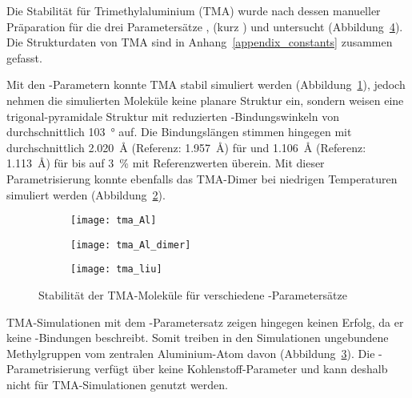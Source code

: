 Die Stabilität für Trimethylaluminium (TMA) wurde nach dessen manueller Präparation für die drei Parametersätze ,  (kurz ) und  untersucht (Abbildung~\ref{fig:tmastability}).
Die Strukturdaten von TMA\cite{haynes_crc_2011} sind in Anhang~\ref{appendix_constants} zusammen gefasst.

Mit den -Parametern konnte TMA stabil simuliert werden (Abbildung~\ref{fig:tmamonomer}), jedoch nehmen die simulierten Moleküle keine planare Struktur ein, sondern weisen eine trigonal-pyramidale Struktur mit reduzierten -Bindungs\-winkeln von durchschnittlich \SI{103}{\degree} auf.
Die Bindungslängen stimmen hingegen mit durchschnittlich \SI{2.020}{\angstrom} (Referenz: \SI{1.957}{\angstrom}\cite{haynes_crc_2011}) für  und \SI{1.106}{\angstrom} (Referenz: \SI{1.113}{\angstrom}\cite{haynes_crc_2011}) für  bis auf \SI{3}{\percent} mit Referenzwerten überein.
Mit dieser Parametrisierung konnte ebenfalls das TMA-Dimer bei niedrigen Temperaturen simuliert werden (Abbildung~\ref{fig:tmadimer}).

\begin{figure}[b!]
  \captionsetup[subfigure]{singlelinecheck=false}
  \begin{subfigure}[t]{4cm}
    \texttt{[image: tma\_Al]}
    \label{fig:tmamonomer}
  \end{subfigure}
  \hfill
  \begin{subfigure}[t]{5.5cm}
    \texttt{[image: tma\_Al\_dimer]}
    \label{fig:tmadimer}
  \end{subfigure}
  \hfill
  \begin{subfigure}[t]{4.5cm}
    \texttt{[image: tma\_liu]}
    \label{fig:tmaliu}
  \end{subfigure}

  \caption{Stabilität der TMA-Moleküle für verschiedene -Parametersätze}
  \label{fig:tmastability}
\end{figure}

TMA-Simulationen mit dem -Parametersatz zeigen hingegen keinen Erfolg, da er keine -Bindungen beschreibt.
Somit treiben in den Simulationen ungebundene Methylgruppen vom zentralen Aluminium-Atom davon (Abbildung~\ref{fig:tmaliu}).
Die -Parametrisierung verfügt über keine Kohlenstoff-Parameter und kann deshalb nicht für TMA-Simulationen genutzt werden.

